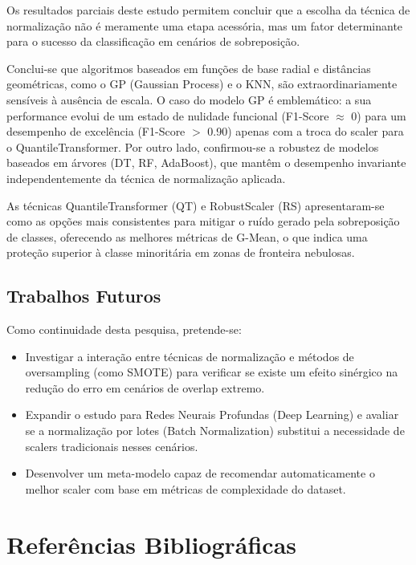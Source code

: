 Os resultados parciais deste estudo permitem concluir que a escolha da técnica de normalização não é meramente uma etapa acessória, mas um fator determinante para o sucesso da classificação em cenários de sobreposição.

Conclui-se que algoritmos baseados em funções de base radial e distâncias geométricas, como o GP (Gaussian Process) e o KNN, são extraordinariamente sensíveis à ausência de escala. O caso do modelo GP é emblemático: a sua performance evolui de um estado de nulidade funcional (F1-Score $\approx$ 0) para um desempenho de excelência (F1-Score $>$ 0.90) apenas com a troca do scaler para o QuantileTransformer. Por outro lado, confirmou-se a robustez de modelos baseados em árvores (DT, RF, AdaBoost), que mantêm o desempenho invariante independentemente da técnica de normalização aplicada.

As técnicas QuantileTransformer (QT) e RobustScaler (RS) apresentaram-se como as opções mais consistentes para mitigar o ruído gerado pela sobreposição de classes, oferecendo as melhores métricas de G-Mean, o que indica uma proteção superior à classe minoritária em zonas de fronteira nebulosas.

\subsection{Trabalhos Futuros}

Como continuidade desta pesquisa, pretende-se:
\begin{itemize}
\item Investigar a interação entre técnicas de normalização e métodos de oversampling (como SMOTE) para verificar se existe um efeito sinérgico na redução do erro em cenários de overlap extremo.

\item Expandir o estudo para Redes Neurais Profundas (Deep Learning) e avaliar se a normalização por lotes (Batch Normalization) substitui a necessidade de scalers tradicionais nesses cenários.

\item Desenvolver um meta-modelo capaz de recomendar automaticamente o melhor scaler com base em métricas de complexidade do dataset.

\end{itemize}
	\newpage

\section{Referências Bibliográficas}
\printbibliography[heading=none]